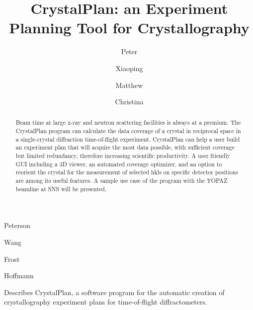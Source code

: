 \documentclass[final]{iucr}              %
\begin{document}


\title{CrystalPlan: an Experiment Planning Tool for Crystallography}



\author[a]{Peter}{Peterson}
\author[a]{Xiaoping}{Wang}
\author[a]{Matthew}{Frost}
\author[a]{Christina}{Hoffmann}







\maketitle                        %

\begin{synopsis}
Describes CrystalPlan, a software program for the automatic creation of 
crystallography experiment plans for time-of-flight diffractometers.
\end{synopsis}

\begin{abstract}
Beam time at large x-ray and neutron scattering facilities is always at a premium.
The CrystalPlan program can calculate the data coverage of a crystal in reciprocal
space in a single-crystal diffraction time-of-flight experiment. CrystalPlan can 
help a user build an experiment plan that will acquire the most data possible, 
with sufficient coverage but limited redundancy, therefore increasing scientific 
productivity. 
A user friendly GUI including a 3D viewer, an automated coverage optimizer,
and an option to reorient the crystal for the measurement 
of selected hkls on specific detector positions 
are among its useful features. 
A sample use case of the program with the TOPAZ beamline at SNS will be
presented. 
\end{abstract}
\end{document}
